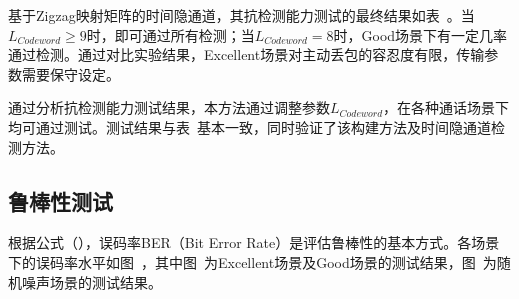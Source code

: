 基于Zigzag映射矩阵的时间隐通道，其抗检测能力测试的最终结果如表\ 。当$L_{Codeword}\ge 9$时，即可通过所有检测；当$L_{Codeword} = 8$时，Good场景下有一定几率通过检测。通过对比实验结果，Excellent场景对主动丢包的容忍度有限，传输参数需要保守设定。

通过分析抗检测能力测试结果，本方法通过调整参数$L_{Codeword}$，在各种通话场景下均可通过测试。测试结果与表\ 基本一致，同时验证了该构建方法及时间隐通道检测方法。

\subsection{鲁棒性测试}
\label{chap:zigzag:results:robustness}


根据公式（），误码率BER（Bit Error Rate）是评估鲁棒性的基本方式。各场景下的误码率水平如图\ ，其中图\ 为Excellent场景及Good场景的测试结果，图\ 为随机噪声场景的测试结果。

